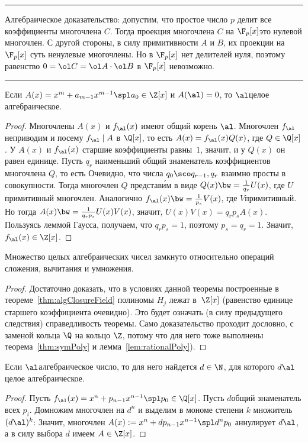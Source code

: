 \documentclass[a4paper]{article}
\newenvironment{petit}
{\par\smallskip\hrule\smallskip\footnotesize}{\par\smallskip\hrule\smallskip}
\begin{document}
\begin{petit}
Алгебраическое доказательство: допустим, что простое число $p$ делит все коэффициенты многочлена $C$.
Тогда проекция многочлена $C$ на $\F_p[x]$\т это нулевой многочлен.
С другой стороны, в силу примитивности $A$ и $B$, их проекции на $\F_p[x]$ суть  ненулевые многочлены.
Но в $\F_p[x]$ нет делителей нуля, поэтому равенство $0 = \ol C = \ol A\cdot \ol B$ в $\F_p[x]$ невозможно.
\end{petit}


\begin{imp}
Если $A(x)=x^m+a_{m-1}x^{m-1}\spl a_0\in\Z[x]$ и $A(\al)=0$, то $\al$\т  целое
алгебраическое.
\end{imp}
\begin{proof}
Многочлены $A(x)$ и $f_{\al}(x)$ имеют общий корень $\al$. Многочлен $f_{\al}$ неприводим и посему
$f_{\al}\mid A$ в $\Q[x]$, то есть $A(x)=f_{\al}(x)Q(x)$, где $Q\in \Q[x]$. У
$A(x)$ и $f_{\al}(x)$ старшие коэффициенты равны~$1$, значит, и у $Q(x)$ он равен единице. Пусть $q_r$\т
наименьший общий знаменатель коэффициентов многочлена $Q$, то есть
Очевидно, что числа $q_0\sco q_{r-1},q_r$ взаимно просты в совокупности.
Тогда многочлен $Q$ представ\'им в виде $Q(x)\bw=\frac1{q_r} U(x)$, где $U$\т примитивный многочлен.
Аналогично $f_{\al}(x)\bw=\frac1{p_s} V(x)$, где $V$\т  примитивный. Но
тогда $A(x)\bw=\frac1{q_rp_s}U(x)V(x)$, значит, $U(x)V(x)=q_r p_s A(x)$. Пользуясь леммой Гаусса,
получаем, что $q_r p_s=1$, поэтому $p_s=q_r=1$. Значит, $f_{\al}(x)\in\Z[x]$.
\end{proof}

\begin{theorem}
Множество целых алгебраических чисел замкнуто относительно операций сложения, вычитания и умножения.
\end{theorem}
\begin{proof}
Достаточно доказать, что в условиях данной теоремы построенные в теореме~\ref{thm:algClosureField} полиномы $H_j$ лежат в~$\Z[x]$
(равенство единице старшего коэффициента очевидно). Это будет означать (в силу предыдущего следствия)
справедливость теоремы. Само доказательство проходит дословно, с заменой кольца $\Q$ на кольцо $\Z$,
потому что для него тоже выполнены теорема~\ref{thm:symPoly} и лемма~\ref{lem:rationalPoly}).
\end{proof}

\begin{lemma}
Если $\al$\т алгебраическое число, то для него найдется $d\in\N$, для которого $d\al$\т целое
алгебраическое.
\end{lemma}
\begin{proof}
Пусть $f_{\al}(x)=x^n+p_{n-1}x^{n-1}\spl p_0\in\Q[x]$. Пусть $d$\т  общий знаменатель
всех $p_i$. Домножим многочлен на $d^n$ и выделим в мономе степени $k$ множитель $(d\al)^k$:
Значит, многочлен $A(x):=x^n+dp_{n-1}x^{n-1}\spl d^np_0$ аннулирует $d\al$,
а в силу выбора $d$ имеем $A\in\Z[x]$.
\end{proof}
\end{document}
